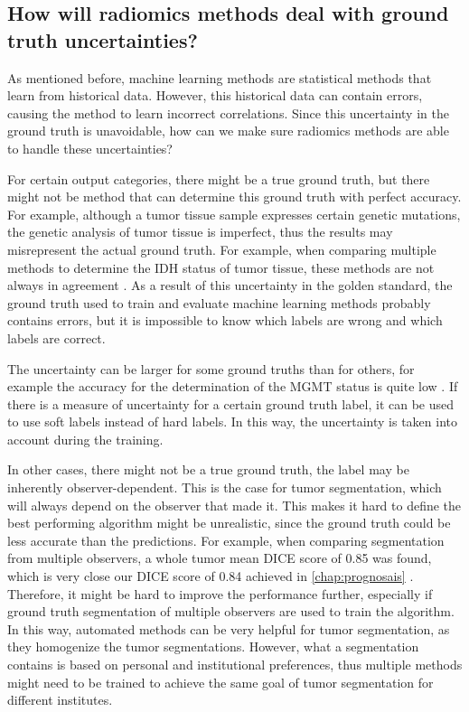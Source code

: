 \subsection{How will radiomics methods deal with ground truth uncertainties?}

As mentioned before, machine learning methods are statistical methods that learn from historical data.
However, this historical data can contain errors, causing the method to learn incorrect correlations.
Since this uncertainty in the ground truth is unavoidable, how can we make sure radiomics methods are able to handle these uncertainties?

For certain output categories, there might be a true ground truth, but there might not be method that can determine this ground truth with perfect accuracy.
For example, although a \gls{tumor} tissue sample expresses certain genetic mutations, the genetic analysis of tumor tissue is imperfect, thus the results may misrepresent the actual ground truth.
For example, when comparing multiple methods to determine the \gls{IDH} status of \gls{tumor} tissue, these methods are not always in agreement \autocite{pyo2016concordance}.
As a result of this uncertainty in the golden standard, the ground truth used to train and evaluate machine learning methods probably contains errors, but it is impossible to know which labels are wrong and which labels are correct.


The uncertainty can be larger for some ground truths than for others, for example the accuracy for the determination of the \gls{MGMT} status is quite low \autocite{wang2017mgmt}.
If there is a measure of uncertainty for a certain ground truth label, it can be used to use soft labels instead of hard labels.
In this way, the uncertainty is taken into account during the training.

In other cases, there might not be a true ground truth, the label may be inherently observer-dependent.
This is the case for \gls{tumor} segmentation, which will always depend on the observer that made it.
This makes it hard to define the best performing algorithm might be unrealistic, since the ground truth could be less accurate than the predictions.
For example, when comparing segmentation from multiple observers, a whole \gls{tumor} mean DICE score of 0.85 was found, which is very close our DICE score of 0.84 achieved in \cref{chap:prognosais} \autocite{menze2015brats}.
Therefore, it might be hard to improve the performance further, especially if ground truth segmentation of multiple observers are used to train the algorithm.
In this way, automated methods can be very helpful for \gls{tumor} segmentation, as they homogenize the \gls{tumor} segmentations.
However, what a segmentation contains is based on personal and institutional preferences, thus multiple methods might need to be trained to achieve the same goal of \gls{tumor} segmentation for different institutes.


